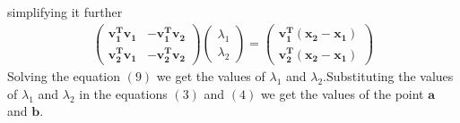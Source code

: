 \documentclass[journal,12pt,twocolumn]{IEEEtran}
\begin{document}
simplifying it further\\
\begin{align}
    \begin{pmatrix}\bm{v_1^T}\bm{v_1} & -\bm{v_1^T}\bm{v_2}\\\bm{v_2^T}\bm{v_1} &  -\bm{v_2^T}\bm{v_2}\end{pmatrix}\begin{pmatrix}\lambda_1\\\lambda_2\end{pmatrix}=\begin{pmatrix}\bm{v_1^T}\bm{(x_2-x_1)}\\\bm{v_2^T}\bm{(x_2-x_1)}\end{pmatrix}
\end{align}
Solving the equation $(9)$ we get the values of $\lambda_1$ and $\lambda_2$.Substituting the values of $\lambda_1$ and $\lambda_2$ in the equations $(3)$ and $(4)$ we get the values of the point $\bm{a}$ and $\bm{b}$.
\end{document}
